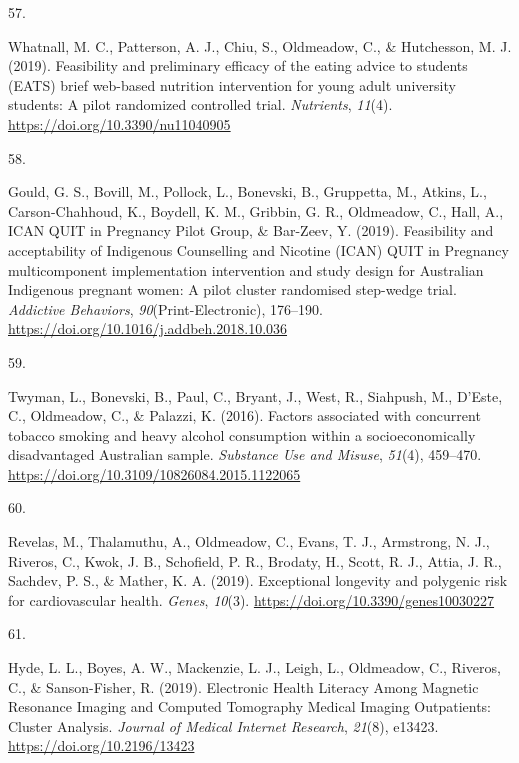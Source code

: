 \documentclass[11pt, a4paper]{awesome-cv}
\newlength{\csllabelwidth}
\newcommand{\CSLLeftMargin}[1]{\parbox[t]{\csllabelwidth}{#1}}
\newcommand{\CSLRightInline}[1]{\parbox[t]{\linewidth - \csllabelwidth}{#1}}
\begin{document}
\leavevmode\hypertarget{ref-whatnall_feasibility_2019}{}%
\CSLLeftMargin{57. }
\CSLRightInline{Whatnall, M. C., Patterson, A. J., Chiu, S., Oldmeadow,
C., \& Hutchesson, M. J. (2019). Feasibility and preliminary efficacy of
the eating advice to students (EATS) brief web-based nutrition
intervention for young adult university students: A pilot randomized
controlled trial. \emph{Nutrients}, \emph{11}(4).
\url{https://doi.org/10.3390/nu11040905}}

\leavevmode\hypertarget{ref-gould_feasibility_2019}{}%
\CSLLeftMargin{58. }
\CSLRightInline{Gould, G. S., Bovill, M., Pollock, L., Bonevski, B.,
Gruppetta, M., Atkins, L., Carson-Chahhoud, K., Boydell, K. M., Gribbin,
G. R., Oldmeadow, C., Hall, A., ICAN QUIT in Pregnancy Pilot Group, \&
Bar-Zeev, Y. (2019). Feasibility and acceptability of Indigenous
Counselling and Nicotine (ICAN) QUIT in Pregnancy multicomponent
implementation intervention and study design for Australian Indigenous
pregnant women: A pilot cluster randomised step-wedge trial.
\emph{Addictive Behaviors}, \emph{90}(Print-Electronic), 176--190.
\url{https://doi.org/10.1016/j.addbeh.2018.10.036}}

\leavevmode\hypertarget{ref-twyman_factors_2016}{}%
\CSLLeftMargin{59. }
\CSLRightInline{Twyman, L., Bonevski, B., Paul, C., Bryant, J., West,
R., Siahpush, M., D'Este, C., Oldmeadow, C., \& Palazzi, K. (2016).
Factors associated with concurrent tobacco smoking and heavy alcohol
consumption within a socioeconomically disadvantaged Australian sample.
\emph{Substance Use and Misuse}, \emph{51}(4), 459--470.
\url{https://doi.org/10.3109/10826084.2015.1122065}}

\leavevmode\hypertarget{ref-revelas_exceptional_2019}{}%
\CSLLeftMargin{60. }
\CSLRightInline{Revelas, M., Thalamuthu, A., Oldmeadow, C., Evans, T.
J., Armstrong, N. J., Riveros, C., Kwok, J. B., Schofield, P. R.,
Brodaty, H., Scott, R. J., Attia, J. R., Sachdev, P. S., \& Mather, K.
A. (2019). Exceptional longevity and polygenic risk for cardiovascular
health. \emph{Genes}, \emph{10}(3).
\url{https://doi.org/10.3390/genes10030227}}

\leavevmode\hypertarget{ref-hyde_electronic_2019}{}%
\CSLLeftMargin{61. }
\CSLRightInline{Hyde, L. L., Boyes, A. W., Mackenzie, L. J., Leigh, L.,
Oldmeadow, C., Riveros, C., \& Sanson-Fisher, R. (2019). Electronic
Health Literacy Among Magnetic Resonance Imaging and Computed Tomography
Medical Imaging Outpatients: Cluster Analysis. \emph{Journal of Medical
Internet Research}, \emph{21}(8), e13423.
\url{https://doi.org/10.2196/13423}}
\end{document}
